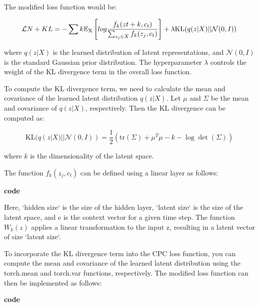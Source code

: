 The modified loss function would be:

\begin{equation}
	\mathcal{L}{N+KL} = - \sum{k} \mathbb{E}{\textsubscript{X}} \left[ log \frac{f_k(z{t+k}, c_t)}{\sum_{z_j \in X} f_k(z_j, c_t)} \right] + \lambda \text{KL}(q(z|X) || \mathcal{N}(0, I))
\end{equation}

where $q(z|X)$ is the learned distribution of latent representations, and $\mathcal{N}(0, I)$ is the standard Gaussian prior distribution. The hyperparameter $\lambda$ controls the weight of the KL divergence term in the overall loss function.

To compute the KL divergence term, we need to calculate the mean and covariance of the learned latent distribution $q(z|X)$. Let $\mu$ and $\Sigma$ be the mean and covariance of $q(z|X)$, respectively. Then the KL divergence can be computed as:

\begin{equation}
	\text{KL}(q(z|X) || \mathcal{N}(0, I)) = \frac{1}{2} \left( \text{tr}(\Sigma) + \mu^T \mu - k - \log \det(\Sigma) \right)
\end{equation}

where $k$ is the dimensionality of the latent space.

The function $f_k(z_j, c_t)$ can be defined using a linear layer as follows:

\textbf{code}

Here, `hidden size` is the size of the hidden layer, `latent size` is the size of the latent space, and c is the context vector for a given time step. The function $W_k(z)$ applies a linear transformation to the input z, resulting in a latent vector of size `latent size`.

To incorporate the KL divergence term into the CPC loss function, you can compute the mean and covariance of the learned latent distribution using the torch.mean and torch.var functions, respectively. The modified loss function can then be implemented as follows:

\textbf{code}
%
%
%
%

